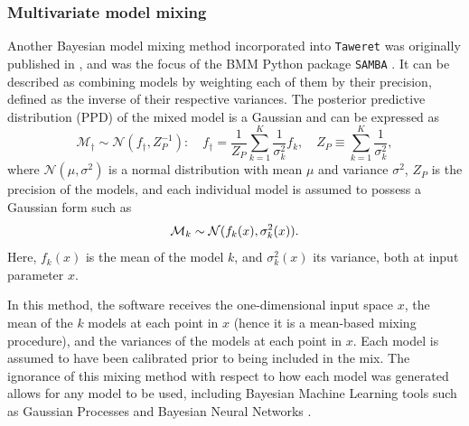 \documentclass[10pt, preprint,aps,prc,floatfix,
tightenlines,
nofootinbib,superscriptaddress]{revtex4-2}
\begin{document}

\subsubsection{Multivariate model mixing} %

Another Bayesian model mixing method incorporated into \texttt{Taweret} was originally published in \cite{Semposki:2022gcp}, and was the focus of the BMM Python package \texttt{SAMBA} \cite{SAMBA}. It can be described as combining models by weighting each of them by their precision, defined as the inverse of their respective variances. The posterior predictive distribution (PPD) of the mixed model is a Gaussian and can be expressed as
\begin{equation}
    \label{eq:multi_mm_gaussian}
   \mathcal M_\dagger \sim {\mathcal N(f_\dagger, Z_P^{-1})}:
    \quad
    f_{\dagger} = \frac{1}{Z_P}\sum_{k=1}^{K} \frac{1}{\sigma^{2}_k}f_k,
    \quad Z_P \equiv \sum_{k=1}^{K}\frac{1}{\sigma^{2}_k},
\end{equation}
where $\mathcal N(\mu, \sigma^2)$ is a normal distribution with mean $\mu$ and variance $\sigma^2$, $Z_{P}$ is the precision of the models, and each individual model is assumed to possess a Gaussian form such as
\begin{equation}
    {\cal M}_{k} \sim {\cal N}(f_{k}(x),\sigma^2_{k}(x)).
\end{equation}
Here, $f_{k}(x)$ is the mean of the model $k$, and $\sigma^{2}_{k}(x)$ its variance, both at input parameter $x$.

In this method, the software receives the one-dimensional input space $x$, the mean of the $k$ models at each point in $x$ (hence it is a mean-based mixing procedure), and the variances of the models at each point in $x$. Each model is assumed to have been calibrated prior to being included in the mix. The ignorance of this mixing method with respect to how each model was generated allows for any model to be used, including Bayesian Machine Learning tools such as Gaussian Processes \cite{Semposki:2022gcp} and Bayesian Neural Networks \cite{Kronheim:2020dmp}.
\end{document}
